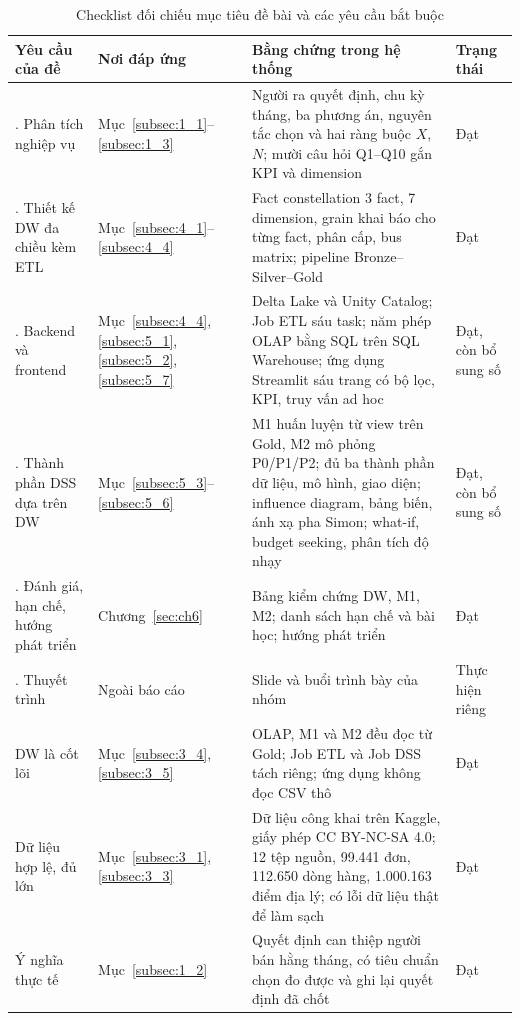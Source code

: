 \documentclass[a4paper]{article}
\begin{document}
\begin{table}[htbp]
\centering
\footnotesize
\setlength{\tabcolsep}{3pt}
\renewcommand{\arraystretch}{1.08}
\caption{Checklist đối chiếu mục tiêu đề bài và các yêu cầu bắt buộc}
\label{tab:rtm_checklist}
\begin{tabularx}{\textwidth}{@{}>{\raggedright\arraybackslash}p{3.3cm}>{\raggedright\arraybackslash}p{1.9cm}>{\raggedright\arraybackslash}X>{\raggedright\arraybackslash}p{1.9cm}@{}}
\toprule
\textbf{Yêu cầu của đề} & \textbf{Nơi đáp ứng} & \textbf{Bằng chứng trong hệ thống} & \textbf{Trạng thái} \\
\midrule
1. Phân tích nghiệp vụ & Mục~\ref{subsec:1_1}--\ref{subsec:1_3} & Người ra quyết định, chu kỳ tháng, ba phương án, nguyên tắc chọn và hai ràng buộc $X$, $N$; mười câu hỏi Q1--Q10 gắn KPI và dimension & Đạt \\
\addlinespace
2. Thiết kế DW đa chiều kèm ETL & Mục~\ref{subsec:4_1}--\ref{subsec:4_4} & Fact constellation 3 fact, 7 dimension, grain khai báo cho từng fact, phân cấp, bus matrix; pipeline Bronze--Silver--Gold & Đạt \\
\addlinespace
3. Backend và frontend & Mục~\ref{subsec:4_4}, \ref{subsec:5_1}, \ref{subsec:5_2}, \ref{subsec:5_7} & Delta Lake và Unity Catalog; Job ETL sáu task; năm phép OLAP bằng SQL trên SQL Warehouse; ứng dụng Streamlit sáu trang có bộ lọc, KPI, truy vấn ad hoc & Đạt, còn bổ sung số \\
\addlinespace
4. Thành phần DSS dựa trên DW & Mục~\ref{subsec:5_3}--\ref{subsec:5_6} & M1 huấn luyện từ view trên Gold, M2 mô phỏng P0/P1/P2; đủ ba thành phần dữ liệu, mô hình, giao diện; influence diagram, bảng biến, ánh xạ pha Simon; what-if, budget seeking, phân tích độ nhạy & Đạt, còn bổ sung số \\
\addlinespace
5. Đánh giá, hạn chế, hướng phát triển & Chương~\ref{sec:ch6} & Bảng kiểm chứng DW, M1, M2; danh sách hạn chế và bài học; hướng phát triển & Đạt \\
\addlinespace
6. Thuyết trình & Ngoài báo cáo & Slide và buổi trình bày của nhóm & Thực hiện riêng \\
\midrule
DW là cốt lõi & Mục~\ref{subsec:3_4}, \ref{subsec:3_5} & OLAP, M1 và M2 đều đọc từ Gold; Job ETL và Job DSS tách riêng; ứng dụng không đọc CSV thô & Đạt \\
\addlinespace
Dữ liệu hợp lệ, đủ lớn & Mục~\ref{subsec:3_1}, \ref{subsec:3_3} & Dữ liệu công khai trên Kaggle, giấy phép CC BY-NC-SA 4.0; 12 tệp nguồn, 99.441 đơn, 112.650 dòng hàng, 1.000.163 điểm địa lý; có lỗi dữ liệu thật để làm sạch & Đạt \\
\addlinespace
Ý nghĩa thực tế & Mục~\ref{subsec:1_2} & Quyết định can thiệp người bán hằng tháng, có tiêu chuẩn chọn đo được và ghi lại quyết định đã chốt & Đạt \\
\bottomrule
\end{tabularx}
\end{table}
\end{document}
